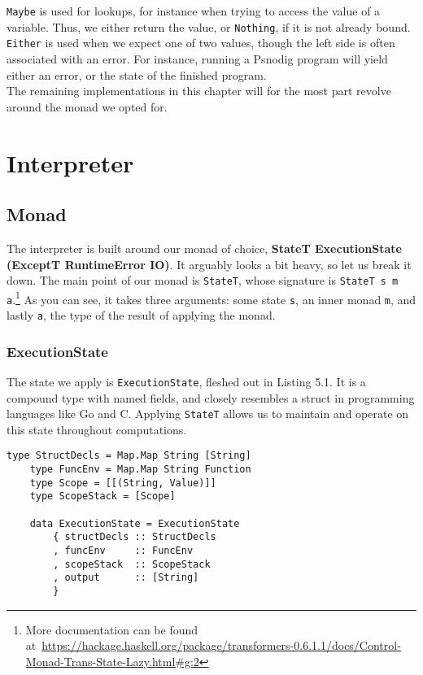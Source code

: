 \texttt{Maybe} is used for lookups, for instance when trying to access the value of a variable. Thus, we either return the value, or \texttt{Nothing}, if it is not already bound. \texttt{Either} is used when we expect one of two values, though the left side is often associated with an error. For instance, running a Psnodig program will yield either an error, or the state of the finished program. \hfill \\

The remaining implementations in this chapter will for the most part revolve around the monad we opted for.

\section{Interpreter}

\subsection{Monad}

The interpreter is built around our monad of choice, \textbf{StateT ExecutionState (ExceptT RuntimeError IO)}. It arguably looks a bit heavy, so let us break it down. The main point of our monad is \texttt{StateT}, whose signature is \texttt{StateT s m a}.\footnote{More documentation can be found at~\url{https://hackage.haskell.org/package/transformers-0.6.1.1/docs/Control-Monad-Trans-State-Lazy.html\#g:2}} As you can see, it takes three arguments: some state \texttt{s}, an inner monad \texttt{m}, and lastly \texttt{a}, the type of the result of applying the monad.

\subsubsection{ExecutionState}

The state we apply is \texttt{ExecutionState}, fleshed out in Listing 5.1. It is a compound type with named fields, and closely resembles a struct in programming languages like Go and C. Applying \texttt{StateT} allows us to maintain and operate on this state throughout computations. \hfill \\

\begin{lstlisting}[caption={The Psnodig interpreter's state}, captionpos=b]
    type StructDecls = Map.Map String [String]
    type FuncEnv = Map.Map String Function
    type Scope = [[(String, Value)]]
    type ScopeStack = [Scope]

    data ExecutionState = ExecutionState
        { structDecls :: StructDecls
        , funcEnv     :: FuncEnv
        , scopeStack  :: ScopeStack
        , output      :: [String]
        }
\end{lstlisting}


